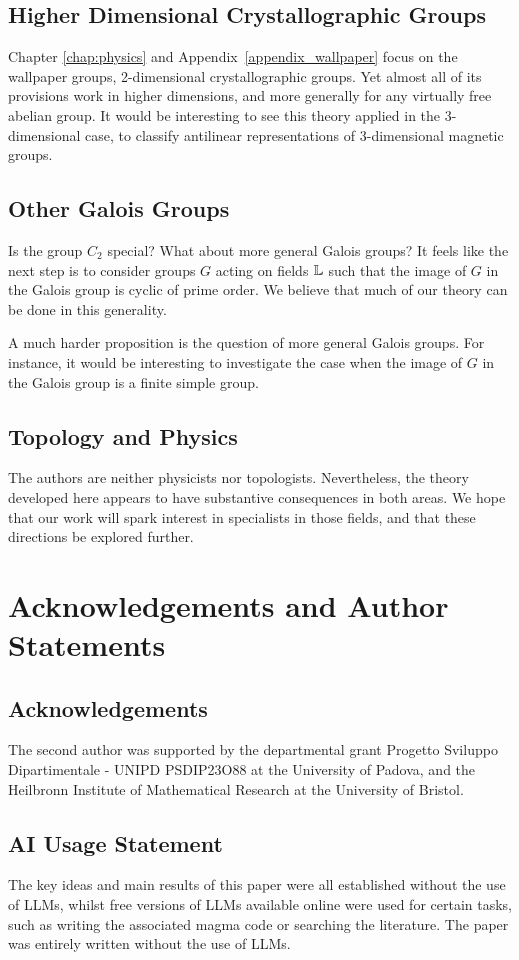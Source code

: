 \subsection*{Higher Dimensional Crystallographic Groups}
Chapter \ref{chap:physics} and Appendix~\ref{appendix_wallpaper} focus on the wallpaper groups, 2-dimensional crystallographic groups. Yet almost all of its provisions work in higher dimensions, and more generally for any virtually free abelian group. It would be interesting to see this theory applied in the 3-dimensional case, to classify antilinear representations of 3-dimensional magnetic groups.

\subsection*{Other Galois Groups}
Is the group $C_2$ special? What about more general Galois groups?
It feels like the next step is to consider groups $G$ acting on fields ${\mathbb L}$ such that
the image of $G$ in the Galois group is cyclic of prime order. We believe that much of our theory can be done in this generality.

A much harder proposition is the question of more general Galois groups.
For instance, it would be interesting to investigate the case when the image of $G$ in the Galois group is a finite simple group.

\subsection*{Topology and Physics}
The authors are neither physicists nor topologists. Nevertheless, the theory developed here appears to have substantive consequences in both areas. We hope that our work will spark interest in specialists in those fields, and that these directions be explored further.

\section*{Acknowledgements and Author Statements}

\subsection*{Acknowledgements} The second author was supported by the departmental grant Progetto Sviluppo Dipartimentale - UNIPD PSDIP23O88 at the University of Padova, and the Heilbronn Institute of Mathematical Research at the University of Bristol.

\subsection*{AI Usage Statement} The key ideas and main results of this paper were all established without the use of LLMs, whilst free versions of LLMs available online were used for certain tasks, such as writing the associated magma code or searching the literature. The paper was entirely written without the use of LLMs.